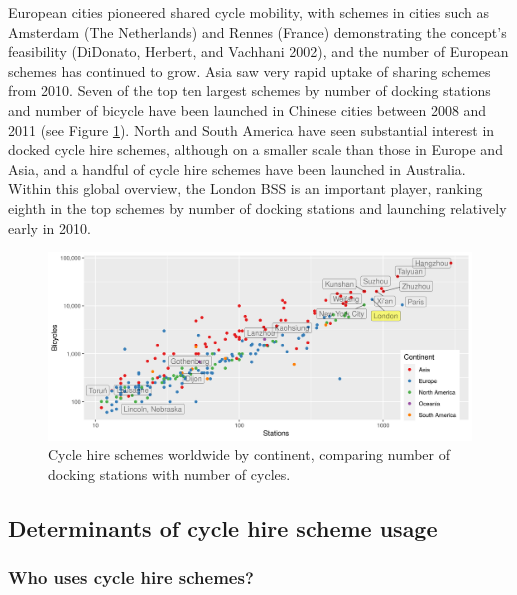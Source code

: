 \documentclass[]{article}
\begin{document}
European cities pioneered shared cycle mobility, with schemes in cities such as Amsterdam (The Netherlands) and Rennes (France) demonstrating the concept's feasibility (DiDonato, Herbert, and Vachhani 2002), and the number of European schemes has continued to grow.
Asia saw very rapid uptake of sharing schemes from 2010. Seven of the top ten largest schemes by number of docking stations and number of bicycle have been launched in Chinese cities between 2008 and 2011 (see Figure \ref{fig:global-stations-cycles}).
North and South America have seen substantial interest in docked cycle hire schemes, although on a smaller scale than those in Europe and Asia, and a handful of cycle hire schemes have been launched in Australia.
Within this global overview, the London BSS is an important player, ranking eighth in the top schemes by number of docking stations and launching relatively early in 2010.

\begin{figure}[h]

{\centering \includegraphics[width=0.8\linewidth]{figures/bikehshare-global-stations-bicycles} 

}

\caption{Cycle hire schemes worldwide by continent, comparing number of docking stations with number of cycles.}\label{fig:global-stations-cycles}
\end{figure}

\hypertarget{determinants-of-cycle-hire-scheme-usage}{%
\subsection{Determinants of cycle hire scheme usage}\label{determinants-of-cycle-hire-scheme-usage}}

\hypertarget{who-uses-cycle-hire-schemes}{%
\subsubsection{Who uses cycle hire schemes?}\label{who-uses-cycle-hire-schemes}}
\end{document}
